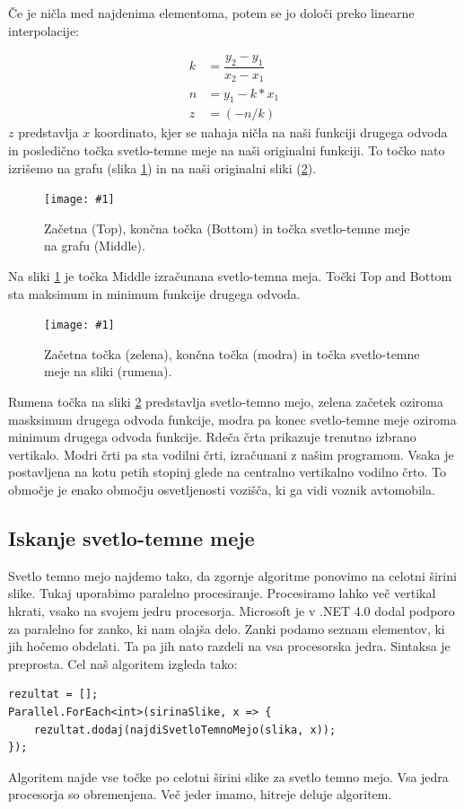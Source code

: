 \documentclass[oneside, a4paper, 12pt]{book}
\newcommand{\slika}[3]{
	\begin{figure}
	\begin{center}
	\texttt{[image: \#1]}
	\end{center}
	\vspace{-20pt}
	\caption{#2}
	\label{#3}
	\end{figure}
}
\begin{document}
Če je ničla med najdenima elementoma, potem se jo določi preko 
linearne interpolacije:

\begin{align}
k &= \dfrac{y_2-y_1}{x_2-x_1}  \nonumber\\
n &= y_1-k*x_1 \\
z &= (-n/k) \nonumber
\end{align} 
$z$ predstavlja $x$ koordinato, kjer se nahaja ničla na naši funkciji 
drugega odvoda in posledično točka svetlo-temne meje na naši originalni 
funkciji. To točko nato izrišemo na grafu (slika \ref{pic:svet-tem}) in 
na naši originalni sliki (\ref{pic:svet-tem2}).

\slika{slike/svetlo-temna-meja.jpg}{Začetna (Top), končna točka (Bottom) 
in točka svetlo-temne meje na grafu (Middle).}{pic:svet-tem}

Na sliki \ref{pic:svet-tem} je točka Middle izračunana svetlo-temna meja. 
Točki Top and Bottom sta maksimum in minimum funkcije drugega odvoda. 


\slika{slike/svetlo-temna-meja-orig-crop.jpg}{Začetna točka (zelena), 
končna točka (modra) in točka svetlo-temne meje na sliki (rumena).}
{pic:svet-tem2}

Rumena točka na sliki \ref{pic:svet-tem2} predstavlja svetlo-temno mejo, 
zelena začetek oziroma masksimum drugega odvoda funkcije, modra pa konec 
svetlo-temne meje oziroma minimum drugega odvoda funkcije. Rdeča črta 
prikazuje trenutno izbrano vertikalo. Modri črti pa sta vodilni črti, 
izračunani z našim programom. Vsaka je postavljena na kotu petih stopinj 
glede na centralno vertikalno vodilno črto. To območje je enako območju
osvetljenosti vozišča, ki ga vidi voznik avtomobila.


\subsection{Iskanje svetlo-temne meje}
\label{ch:iskanj-sv-t-m}
Svetlo temno mejo najdemo tako, da zgornje algoritme ponovimo na celotni 
širini slike. Tukaj uporabimo paralelno procesiranje. Procesiramo lahko 
več vertikal hkrati, vsako na svojem jedru procesorja. Microsoft je v 
.NET 4.0 dodal podporo za paralelno for zanko, ki nam olajša delo. Zanki 
podamo seznam elementov, ki jih hočemo obdelati. Ta pa jih nato razdeli 
na vsa procesorska jedra. Sintaksa je preprosta. Cel naš algoritem izgleda 
tako:
\begin{samepage}
\begin{verbatim}
rezultat = [];
Parallel.ForEach<int>(sirinaSlike, x => {
    rezultat.dodaj(najdiSvetloTemnoMejo(slika, x));
});
\end{verbatim}
\end{samepage}
Algoritem najde vse točke po celotni širini slike za svetlo temno mejo. 
Vsa jedra procesorja so obremenjena. Več jeder imamo, hitreje deluje 
algoritem.
\end{document}
